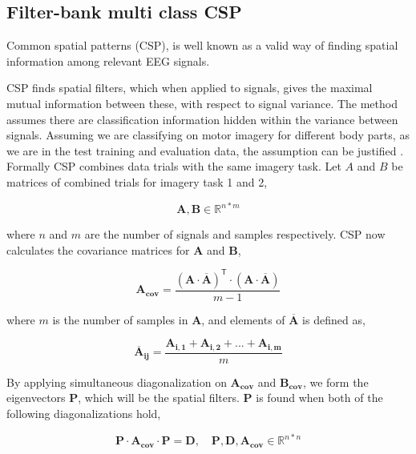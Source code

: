 \subsection{Filter-bank multi class CSP}
Common spatial patterns (CSP), is well known as a valid way of finding spatial information among  relevant EEG signals. 

CSP finds spatial filters, which when applied to signals, gives the maximal mutual information between these, with respect to signal variance. The method assumes there are classification information hidden within the variance between signals. Assuming we are classifying on motor imagery for different body parts, as we are in the test training and evaluation data, the assumption can be justified \cite{blankertz2008optimizing}.
Formally CSP combines data trials with the same imagery task. Let $A$ and $B$ be matrices of combined trials for imagery task 1 and 2,

\begin{equation}
\label{eq:csp_data}
\pmb{A}, \pmb{B} \in \mathbb{R}^{n*m}
\end{equation}

where $n$ and $m$ are the number of signals and samples respectively. CSP now calculates the covariance matrices for $\pmb{A}$ and $\pmb{B}$,

\begin{equation}
\label{eq:covariance_matrice}
\pmb{A_{cov}} = \frac{(\pmb{A} \cdot \overline{\pmb{A}})^\mathsf{T}  \cdot (\pmb{A} \cdot \overline{\pmb{A}})}{m - 1}
\end{equation}

where $m$ is the number of samples in $\pmb{A}$, and elements of $\overline{\pmb{A}}$ is defined as,

\begin{equation}
\label{eq:a_bar}
\pmb{\overline{A}_{ij}} = \frac{\pmb{A_{i,1}} + \pmb{A_{i,2}} + ... + \pmb{A_{i,m}}}{m}
\end{equation}

By applying simultaneous diagonalization on $\pmb{A_{cov}}$ and $\pmb{B_{cov}}$, we form the eigenvectors $\pmb{P}$, which will be the spatial filters. $\pmb{P}$ is found when both of the following diagonalizations hold, 

\begin{equation}
\label{eq:diagonalization_A}
\pmb{P} \cdot \pmb{A_{cov}} \cdot \pmb{P} = \pmb{D}, \quad \pmb{P}, \pmb{D}, \pmb{A_{cov}} \in \mathbb{R}^{n*n}
\end{equation}

